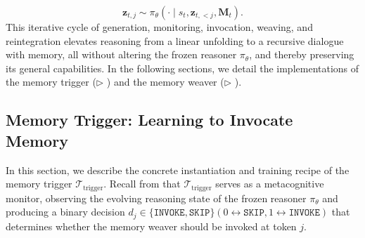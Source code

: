 \documentclass[]{fairmeta}
\begin{document}
\begin{equation}\label{eq:append}
\mathbf{z}_{t,j} \sim \pi_\theta(\cdot \mid s_t, \mathbf{z}_{t,<j}, \mathbf{M}_t).
\end{equation}
This iterative cycle of generation, monitoring, invocation, weaving, and reintegration elevates reasoning from a linear unfolding to a recursive dialogue with memory, all without altering the frozen reasoner $\pi_\theta$, and thereby preserving its general capabilities. In the following sections, we detail the implementations of the memory trigger ($\triangleright$ ) and the memory weaver ($\triangleright$ ).







\vspace{-0.5em}
\subsection{Memory Trigger: Learning to Invocate Memory}
\label{sec:trigger}

\vspace{-0.3em}
In this section, we describe the concrete instantiation and training recipe of the memory trigger $\mathcal{T}_\text{trigger}$. Recall from  that $\mathcal{T}_\text{trigger}$ serves as a metacognitive monitor, observing the evolving reasoning state of the frozen reasoner $\pi_\theta$ and producing a binary decision $d_j \in \{\texttt{INVOKE}, \texttt{SKIP}\} (0\leftrightarrow\texttt{SKIP},1\leftrightarrow\texttt{INVOKE})$ that determines whether the memory weaver should be invoked at token $j$.

\vspace{-0.8em}
\end{document}
